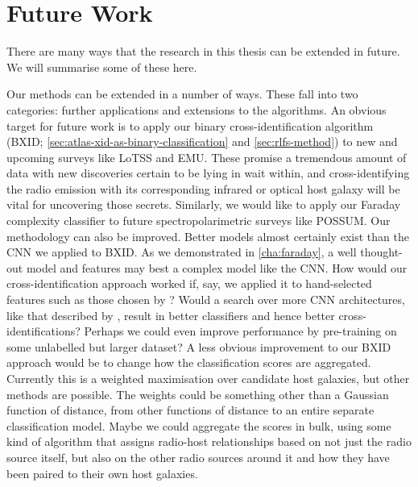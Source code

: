 \documentclass[11pt, a4paper]{book}
\begin{document}




\section{Future Work}
\label{sec:future}

    There are many ways that the research in this thesis can be extended in future. We will summarise some of these here.

    Our methods can be extended in a number of ways. These fall into two categories: further applications and extensions to the algorithms. An obvious target for future work is to apply our binary cross-identification algorithm (BXID; \autoref{sec:atlas-xid-as-binary-classification} and \autoref{sec:rlfs-method}) to new and upcoming surveys like LoTSS and EMU. These promise a tremendous amount of data with new discoveries certain to be lying in wait within, and cross-identifying the radio emission with its corresponding infrared or optical host galaxy will be vital for uncovering those secrets. Similarly, we would like to apply our Faraday complexity classifier to future spectropolarimetric surveys like POSSUM. Our methodology can also be improved. Better models almost certainly exist than the CNN we applied to BXID. As we demonstrated in \autoref{cha:faraday}, a well thought-out model and features may best a complex model like the CNN. How would our cross-identification approach worked if, say, we applied it to hand-selected features such as those chosen by \citet{proctor06}? Would a search over more CNN architectures, like that described by \citet{lukic_morphological_2019}, result in better classifiers and hence better cross-identifications? Perhaps we could even improve performance by pre-training on some unlabelled but larger dataset? A less obvious improvement to our BXID approach would be to change how the classification scores are aggregated. Currently this is a weighted maximisation over candidate host galaxies, but other methods are possible. The weights could be something other than a Gaussian function of distance, from other functions of distance to an entire separate classification model. Maybe we could aggregate the scores in bulk, using some kind of algorithm that assigns radio-host relationships based on not just the radio source itself, but also on the other radio sources around it and how they have been paired to their own host galaxies.
\end{document}
